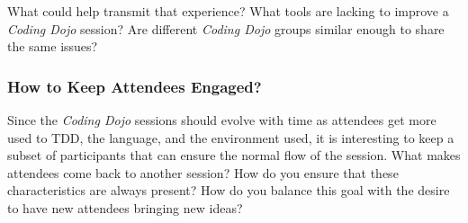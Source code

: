 What could help transmit that experience? What tools are lacking to
improve a \emph{Coding Dojo} session? Are different \emph{Coding Dojo}
groups similar enough to share the same issues?

\subsubsection{How to Keep Attendees Engaged?}

Since the \textit{Coding Dojo} sessions should evolve with time as
attendees get more used to TDD, the language, and the environment used,
it is interesting to keep a subset of participants that can ensure the
normal flow of the session. What makes attendees come back to another
session? How do you ensure that these characteristics are always present?
How do you balance this goal with the desire to have new attendees bringing
new ideas?